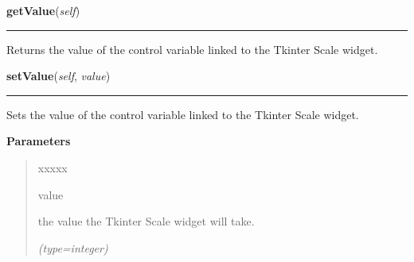     \label{nMOLDYN:GUI:Widgets:ComboScale:getValue}

    \vspace{0.5ex}

\hspace{.8\funcindent}\begin{boxedminipage}{\funcwidth}

    \raggedright \textbf{getValue}(\textit{self})

    \vspace{-1.5ex}

    \rule{\textwidth}{0.5\fboxrule}
\setlength{\parskip}{2ex}
    Returns the value of the control variable linked to the Tkinter Scale 
    widget.

\setlength{\parskip}{1ex}
    \end{boxedminipage}

    \label{nMOLDYN:GUI:Widgets:ComboScale:setValue}

    \vspace{0.5ex}

\hspace{.8\funcindent}\begin{boxedminipage}{\funcwidth}

    \raggedright \textbf{setValue}(\textit{self}, \textit{value})

    \vspace{-1.5ex}

    \rule{\textwidth}{0.5\fboxrule}
\setlength{\parskip}{2ex}
    Sets the value of the control variable linked to the Tkinter Scale 
    widget.

\setlength{\parskip}{1ex}
      \textbf{Parameters}
      \vspace{-1ex}

      \begin{quote}
        \begin{Ventry}{xxxxx}

          \item[value]

          the value the Tkinter Scale widget will take.

            {\it (type=integer)}

        \end{Ventry}

      \end{quote}

    \end{boxedminipage}


